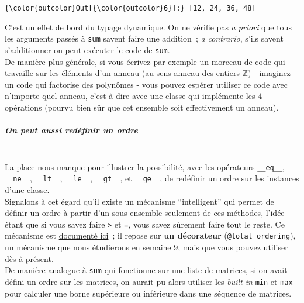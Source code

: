 \begin{Verbatim}[commandchars=\\\{\}]
{\color{outcolor}Out[{\color{outcolor}6}]:} [12, 24, 36, 48]
\end{Verbatim}
            
    C'est un effet de bord du typage dynamique. On ne vérifie pas \emph{a
priori} que tous les arguments passés à \texttt{sum} savent faire une
addition~; \emph{a contrario}, s'ils savent s'additionner on peut
exécuter le code de \texttt{sum}.\\

De manière plus générale, si vous écrivez par exemple un morceau de code
qui travaille sur les éléments d'un anneau (au sens anneau des entiers
\(\mathbb{Z}\)) - imaginez un code qui factorise des polynômes - vous
pouvez espérer utiliser ce code avec n'importe quel anneau, c'est à dire
avec une classe qui implémente les 4 opérations (pourvu bien sûr que cet
ensemble soit effectivement un anneau).

    \hypertarget{on-peut-aussi-reduxe9finir-un-ordre}{%
\subparagraph{On peut aussi redéfinir un
ordre\\\\}\label{on-peut-aussi-reduxe9finir-un-ordre}}

    La place nous manque pour illustrer la possibilité, avec les opérateurs
\texttt{\_\_eq\_\_}, \texttt{\_\_ne\_\_}, \texttt{\_\_lt\_\_},
\texttt{\_\_le\_\_}, \texttt{\_\_gt\_\_}, et \texttt{\_\_ge\_\_}, de
redéfinir un ordre sur les instances d'une classe.\\

Signalons à cet égard qu'il existe un mécanisme ``intelligent'' qui
permet de définir un ordre à partir d'un sous-ensemble seulement de ces
méthodes, l'idée étant que si vous savez faire \texttt{\textgreater{}}
et \texttt{=}, vous savez sûrement faire tout le reste. Ce mécanisme est
\href{https://docs.python.org/3/library/functools.html\#functools.total_ordering}{documenté
ici}~; il repose sur \textbf{un décorateur} (\texttt{@total\_ordering}),
un mécanisme que nous étudierons en semaine 9, mais que vous pouvez
utiliser dès à présent.\\

    De manière analogue à \texttt{sum} qui fonctionne sur une liste de
matrices, si on avait défini un ordre sur les matrices, on aurait pu
alors utiliser les \emph{built-in} \texttt{min} et \texttt{max} pour
calculer une borne supérieure ou inférieure dans une séquence de
matrices.

